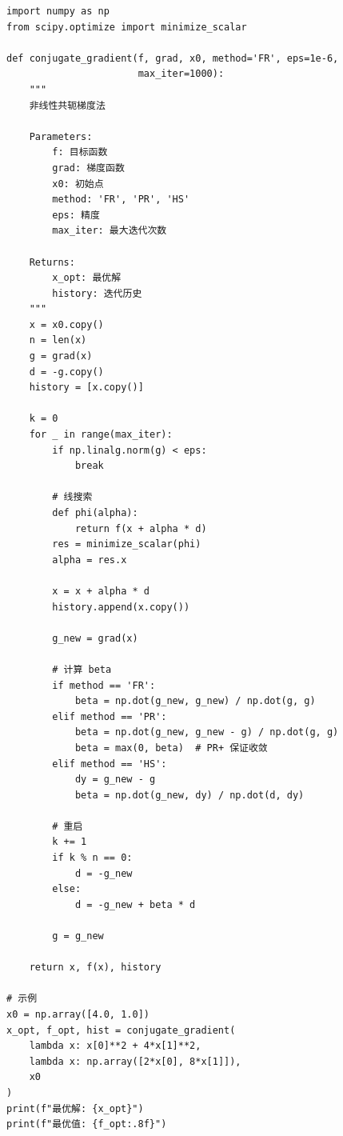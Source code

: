 \begin{codebox}[共轭梯度法]
\begin{lstlisting}
import numpy as np
from scipy.optimize import minimize_scalar

def conjugate_gradient(f, grad, x0, method='FR', eps=1e-6,
                       max_iter=1000):
    """
    非线性共轭梯度法
    
    Parameters:
        f: 目标函数
        grad: 梯度函数
        x0: 初始点
        method: 'FR', 'PR', 'HS'
        eps: 精度
        max_iter: 最大迭代次数
    
    Returns:
        x_opt: 最优解
        history: 迭代历史
    """
    x = x0.copy()
    n = len(x)
    g = grad(x)
    d = -g.copy()
    history = [x.copy()]
    
    k = 0
    for _ in range(max_iter):
        if np.linalg.norm(g) < eps:
            break
        
        # 线搜索
        def phi(alpha):
            return f(x + alpha * d)
        res = minimize_scalar(phi)
        alpha = res.x
        
        x = x + alpha * d
        history.append(x.copy())
        
        g_new = grad(x)
        
        # 计算 beta
        if method == 'FR':
            beta = np.dot(g_new, g_new) / np.dot(g, g)
        elif method == 'PR':
            beta = np.dot(g_new, g_new - g) / np.dot(g, g)
            beta = max(0, beta)  # PR+ 保证收敛
        elif method == 'HS':
            dy = g_new - g
            beta = np.dot(g_new, dy) / np.dot(d, dy)
        
        # 重启
        k += 1
        if k % n == 0:
            d = -g_new
        else:
            d = -g_new + beta * d
        
        g = g_new
    
    return x, f(x), history

# 示例
x0 = np.array([4.0, 1.0])
x_opt, f_opt, hist = conjugate_gradient(
    lambda x: x[0]**2 + 4*x[1]**2,
    lambda x: np.array([2*x[0], 8*x[1]]),
    x0
)
print(f"最优解: {x_opt}")
print(f"最优值: {f_opt:.8f}")
\end{lstlisting}
\end{codebox}

